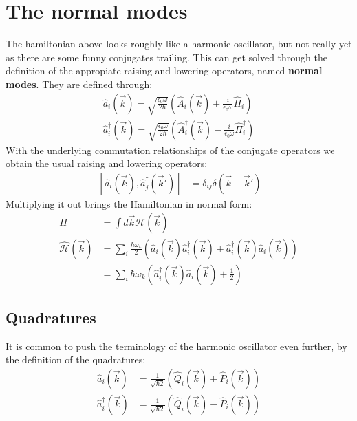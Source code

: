 \documentclass[10pt]{article}
\begin{document}
\section{The normal modes}
The hamiltonian above looks roughly like a harmonic oscillator, but not really yet as there are some funny conjugates trailing. This can get solved through the definition of the appropiate raising and lowering operators, named \textbf{normal modes}. They are defined through:
\begin{align}
\hat{a}_i(\vec{k}) = \sqrt{\frac{\epsilon_0 \omega}{2\hbar }}\left(\hat{A}_i(\vec{k})+\frac{i}{\epsilon_0\omega}\hat{\Pi}_i\right)\\
\hat{a}^\dag_i(\vec{k}) = \sqrt{\frac{\epsilon_0 \omega}{2\hbar }}\left(\hat{A}^\dag_i(\vec{k})-\frac{i}{\epsilon_0\omega}\hat{\Pi}_i^\dag \right)
\end{align}
With the underlying commutation relationships of the conjugate operators we obtain the usual raising and lowering operators:
\begin{align}
~[\hat{a}_i(\vec{k}), \hat{a}^\dag_j(\vec{k}')] &=\delta_{ij}\delta(\vec{k}-\vec{k}')
\end{align}
Multiplying it out brings the Hamiltonian in normal form:
\begin{align}
H &= \int d\vec{k} \mathcal{H}(\vec{k})\\
\hat{\mathcal{H}}(\vec{k}) &= \sum_i  \frac{\hbar\omega_k}{2}\left(\hat{a}_i(\vec{k})\hat{a}_i^\dag(\vec{k})+\hat{a}_i^\dag(\vec{k})\hat{a}_i(\vec{k})\right)\\
&= \sum_i \hbar\omega_k\left(\hat{a}^\dag_i(\vec{k})\hat{a}_i(\vec{k})+\frac{1}{2}\right)
\end{align}

\subsection{Quadratures}
It is common to push the terminology of the harmonic oscillator even further, by the definition of the quadratures:
\begin{align}
\hat{a}_i(\vec{k}) &= \frac{1}{\sqrt{\hbar2}}\left(\hat{Q}_i(\vec{k})+\hat{P}_i(\vec{k})\right)\\
\hat{a}^\dag_i(\vec{k}) &=\frac{1}{\sqrt{\hbar2}}\left(\hat{Q}_i(\vec{k})-\hat{P}_i(\vec{k})\right)
\end{align}
\end{document}
